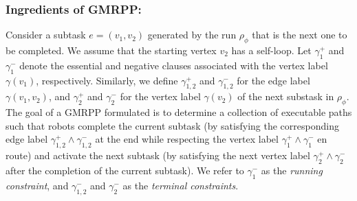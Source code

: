 \documentclass[Afour,sageh,times]{sagej}
\newcommand{\autop}{\ccalA_{\phi}}
\newcommand{\domanda}[1]{\subsubsection*{#1}}
\begin{document}
{{ %

\subsubsection{Ingredients of GMRPP:}\label{sec:gmmpp1} Consider a subtask $e = (v_1, v_2)$ generated by the run $\rho_\phi$ that is the next one to be completed. We assume that the starting vertex $v_2$ has a self-loop. Let $\gamma_1^+$ and $\gamma_1^-$ denote the essential and negative clauses associated with the vertex label $\gamma(v_1)$, respectively. Similarly, we define  $\gamma_{1,2}^{+}$ and $\gamma_{1,2}^{-}$  for the edge label $\gamma(v_1, v_2)$, and  $\gamma_2^+$ and $\gamma_2^-$ for the vertex label $\gamma(v_2)$ of the next substask in $\rho_\phi$. The goal of a GMRPP formulated  is to determine a collection of executable paths such that robots complete the current subtask (by satisfying the corresponding edge label $\gamma_{1,2}^+ \wedge \gamma_{1,2}^-$ at the end while respecting the vertex label $\gamma_1^+ \wedge \gamma_1^-$ en route) and activate the next subtask (by satisfying the next vertex label $\gamma_2^{+}\wedge \gamma_2^{-}$ after the completion of the current subtask). We refer to $\gamma_1^-$ as the {\it running constraint}, and $\gamma_{1,2}^- $ and $ \gamma_2^{-}$ as the {\it terminal constraints}.

}}
\end{document}

